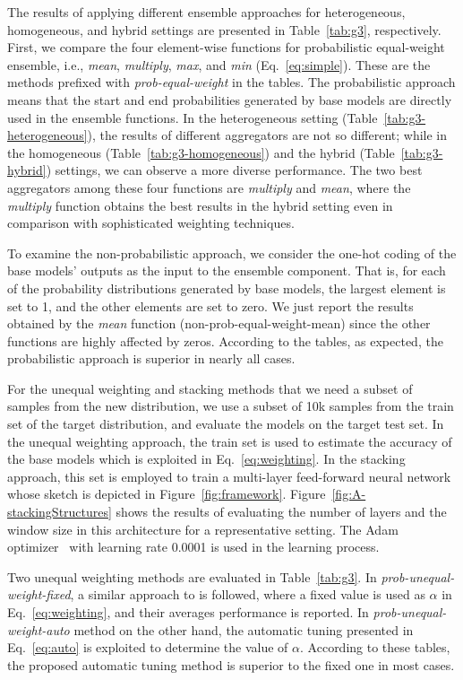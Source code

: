 \documentclass[review]{elsarticle}
\begin{document}
The results of applying different ensemble approaches for heterogeneous, homogeneous, and hybrid settings are presented in Table~\ref{tab:g3}, respectively. First, we compare the four element-wise functions for probabilistic equal-weight ensemble, i.e., \textit{mean}, \textit{multiply}, \textit{max}, and \textit{min} (Eq.~\ref{eq:simple}). These are the methods prefixed with \textit{prob-equal-weight} in the tables. The probabilistic approach means that the start and end probabilities generated by base models are directly used in the ensemble functions.
In the heterogeneous setting (Table~\ref{tab:g3-heterogeneous}), the results of different aggregators are not so different; while in the homogeneous (Table~\ref{tab:g3-homogeneous}) and the hybrid (Table~\ref{tab:g3-hybrid}) settings, we can observe a more diverse performance. The two best aggregators among these four functions are \textit{multiply} and \textit{mean}, where the \textit{multiply} function obtains the best results in the hybrid setting even in comparison with sophisticated weighting techniques.

To examine the non-probabilistic approach, we consider the one-hot coding of the base models' outputs as the input to the ensemble component. That is, for each of the probability distributions generated by base models, the largest element is set to 1, and the other elements are set to zero. We just report the results obtained by the \textit{mean} function (non-prob-equal-weight-mean) since the other functions are highly affected by zeros. According to the tables, as expected, the probabilistic approach is superior in nearly all cases.

For the unequal weighting and stacking methods that we need a subset of samples from the new distribution, we use a subset of 10k samples from the train set of the target distribution, and evaluate the models on the target test set. In the unequal weighting approach, the train set is used to estimate the accuracy of the base models which is exploited in Eq.~\eqref{eq:weighting}. In the stacking approach, this set is employed to train a multi-layer feed-forward neural network whose sketch is depicted in Figure~\ref{fig:framework}. Figure~\ref{fig:A-stackingStructures} shows the results of evaluating the number of layers and the window size in this architecture for a representative setting. The Adam optimizer~\citep{ADAM} with learning rate 0.0001 is used in the learning process. 

Two unequal weighting methods are evaluated in Table~\ref{tab:g3}. In \textit{prob-unequal-weight-fixed}, a similar approach to \citep{RN261} is followed, where a fixed value is used as $\alpha$ in Eq.~\eqref{eq:weighting}, and their averages performance is reported.
 In \textit{prob-unequal-weight-auto} method on the other hand, the automatic tuning presented in Eq.~\eqref{eq:auto} is exploited to determine the value of $\alpha$. According to these tables, the proposed automatic tuning method is superior to the fixed one in most cases.
 
\end{document}
